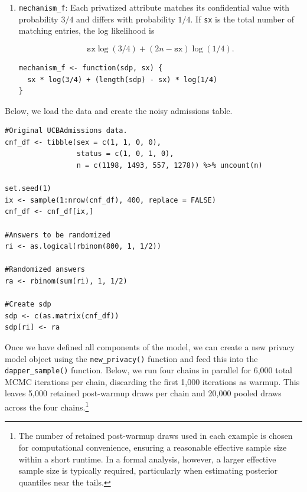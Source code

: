 \begin{enumerate}
\begin{verbatim}
statistic_f <- function(xi, sdp, i) {
  n <- length(sdp) %/% 2
  sum(xi == sdp[c(i, n + i)])
}
\end{verbatim}
\item
  \texttt{mechanism\_f}: Each privatized attribute matches its confidential value with
  probability \(3/4\) and differs with probability \(1/4\). If \texttt{sx} is the total
  number of matching entries, the log likelihood is

  \begin{equation*}
   \texttt{sx}\log(3/4) + (2n - \texttt{sx})\log(1/4).
   \end{equation*}

\begin{verbatim}
mechanism_f <- function(sdp, sx) {
  sx * log(3/4) + (length(sdp) - sx) * log(1/4)
}
\end{verbatim}
\end{enumerate}

Below, we load the data and create the noisy admissions table.

\begin{verbatim}
#Original UCBAdmissions data.
cnf_df <- tibble(sex = c(1, 1, 0, 0),
                 status = c(1, 0, 1, 0),
                 n = c(1198, 1493, 557, 1278)) %>% uncount(n)

set.seed(1) 
ix <- sample(1:nrow(cnf_df), 400, replace = FALSE)
cnf_df <- cnf_df[ix,]

#Answers to be randomized
ri <- as.logical(rbinom(800, 1, 1/2)) 

#Randomized answers
ra <- rbinom(sum(ri), 1, 1/2)

#Create sdp
sdp <- c(as.matrix(cnf_df))
sdp[ri] <- ra
\end{verbatim}

Once we have defined all components of the model, we can
create a new privacy model object using the \texttt{new\_privacy()} function and
feed this into the \texttt{dapper\_sample()} function. Below, we run four chains in
parallel for 6,000 total MCMC iterations per chain, discarding the first 1,000
iterations as warmup. This leaves 5,000 retained post-warmup draws per chain
and 20,000 pooled draws across the four chains.\footnote{The number of retained post-warmup draws
  used in each example is chosen for computational convenience, ensuring a reasonable effective
  sample size within a short runtime. In a formal analysis, however, a larger effective sample size is
  typically required, particularly when estimating posterior quantiles near the tails.}

